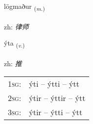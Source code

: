 \documentclass[frontgrid, backgrid]{flacards}\usepackage[]{graphicx}\usepackage[]{color}
\begin{document}
\renewcommand{\flhead}{\vskip5pt \fboxsep=0pt {\small\bfseries\footnotesize Nafnorð | 名词}}
\renewcommand{\fcfoot}{\vskip5pt \fboxsep=0pt \hspace{2pt}{\small\bfseries\footnotesize 2K}}

\renewcommand{\blhead}{\vskip5pt {\small\bfseries\footnotesize Nafnorð | 名词 }}
\renewcommand{\bcfoot}{\vskip5pt \hspace{2pt}{\small\bfseries\footnotesize 2K}}


{lögmaður \small{\textsubscript{(\textit{m.})}} \\[1ex] %
\textphonetic{[lœɣmaðʏr]} \\
zh: \emph{律师} \\  [2ex]
\renewcommand*{\arraystretch}{0.8}
}

\renewcommand{\flhead}{\vskip5pt \fboxsep=0pt {\small\bfseries\footnotesize Sagnorð | 动词}}
\renewcommand{\fcfoot}{\vskip5pt \fboxsep=0pt \hspace{2pt}{\small\bfseries\footnotesize 2K}}

\renewcommand{\blhead}{\vskip5pt {\small\bfseries\footnotesize Sagnorð | 动词 }}
\renewcommand{\bcfoot}{\vskip5pt \hspace{2pt}{\small\bfseries\footnotesize 2K}}


{ýta \small{\textsubscript{(\textit{v.})}} \\[1ex] %
\textphonetic{[iːta]} \\
zh: \emph{推} \\  [2ex]
\renewcommand*{\arraystretch}{0.8}
\begin{tabular}{p{1cm}l}
\textsc{1sg}: & ýti -- ýtti -- ýtt \\ 
\textsc{2sg}: & ýtir -- ýttir -- ýtt \\ 
\textsc{3sg}: & ýtir -- ýtti -- ýtt \\ 
\end{tabular}
}
\end{document}
